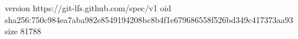 version https://git-lfs.github.com/spec/v1
oid sha256:750c984ea7aba982e8549194208bc8b4f1e679686558f526bd349c417373aa93
size 81788
